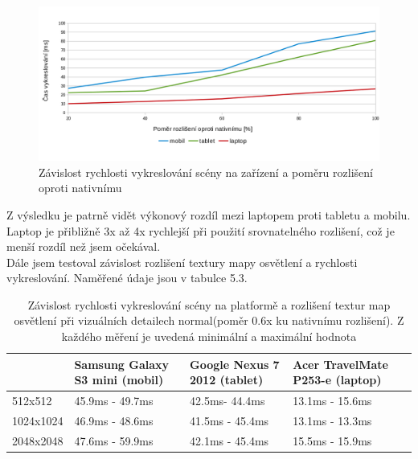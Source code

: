 \documentclass[11pt,twoside,a4paper]{book}
\begin{document}
\begin{figure}[h!]
\includegraphics[width=150mm]{figures/graf2.png}
\caption{Závislost rychlosti vykreslování scény na zařízení a poměru rozlišení oproti nativnímu}
\end{figure}

Z výsledku je patrně vidět výkonový rozdíl mezi laptopem proti tabletu a mobilu. Laptop je přibližně 3x až 4x rychlejší při použití srovnatelného rozlišení, což je menší rozdíl než jsem očekával.
\\

Dále jsem testoval závislost rozlišení textury mapy osvětlení a rychlosti vykreslování. Naměřené údaje jsou v tabulce 5.3.

\begin{table}[h!]
\begin{center}
\begin{tabular}{|p{35mm}|p{35mm}|p{35mm}|p{35mm}|}
\hline
& \textbf{Samsung Galaxy S3 mini (mobil)} & \textbf{Google Nexus 7 2012 (tablet)} & \textbf{Acer TravelMate P253-e (laptop)} \\
\hline
512x512 & 45.9ms - 49.7ms & 42.5ms- 44.4ms & 13.1ms - 15.6ms \\ \hline
1024x1024 & 46.9ms - 48.6ms & 41.5ms - 45.4ms & 13.1ms - 13.3ms \\ \hline
2048x2048 & 47.6ms - 59.9ms & 42.1ms - 45.4ms & 15.5ms - 15.9ms \\ \hline
\end{tabular}
\caption{Závislost rychlosti vykreslování scény na platformě a rozlišení textur map osvětlení při vizuálních detailech normal(poměr 0.6x ku nativnímu rozlišení). Z každého měření je uvedená minimální a maximální hodnota}
\end{center}
\end{table}
\end{document}
